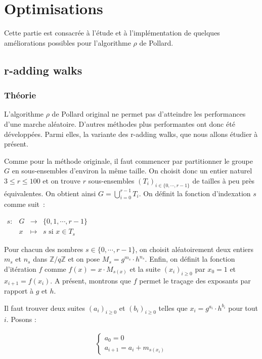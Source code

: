 \chapter{Optimisations}
    Cette partie est consacrée à l'étude et à l'implémentation de quelques améliorations possibles pour l'algorithme $\rho$ de Pollard.

    \section{r-adding walks}
      \subsection{Théorie}
      L'algorithme $\rho$ de Pollard original ne permet pas d'atteindre les performances d'une marche aléatoire. D'autres méthodes plus performantes ont donc été développées. Parmi elles, la variante des r-adding walks, que nous allons étudier à présent.

      Comme pour la méthode originale, il faut commencer par partitionner le groupe $G$ en sous-ensembles d'environ la même taille. On choisit donc un entier naturel $3 \leq r \leq 100$ et on trouve $r$ sous-ensembles $(T_i)_{i \in \{0,\cdots,r-1\}}$ de tailles à peu près équivalentes. On obtient ainsi $G = \bigcup\limits_{i=0}^{r-1} T_i$. On définit la fonction d'indexation $s$ comme suit~:

      \begin{center}
        $\begin{array}{lrcl}
        s : & G & \longrightarrow & \{0,1,\cdots,r-1\} \\
            & x & \longmapsto & s \text{ si } x \in T_s
        \end{array}$
      \end{center}

      Pour chacun des nombres $s \in \{0,\cdots,r-1\}$, on choisit aléatoirement deux entiers $m_s$ et $n_s$ dans $\mathbb{Z}/q\mathbb{Z}$ et on pose $M_s = g^{m_s} \cdot h^{n_s}$. Enfin, on définit la fonction d'itération $f$ comme $f(x) = x \cdot M_{s(x)}$ et la suite $(x_i)_{i \ge 0}$ par $x_0 = 1$ et $x_{i+1} = f(x_i)$. A présent, montrons que $f$ permet le traçage des exposants par rapport à $g$ et $h$.

      Il faut trouver deux suites $(a_i)_{i \ge 0}$ et $(b_i)_{i \ge 0}$ telles que $x_i = g^{a_i} \cdot h^{b_i}$ pour tout $i$. Posons :

      \begin{align*}
        \begin{cases}
          a_0 = 0 \\
          a_{i+1} = a_i + m_{s(x_i)}
        \end{cases}
      \end{align*}

